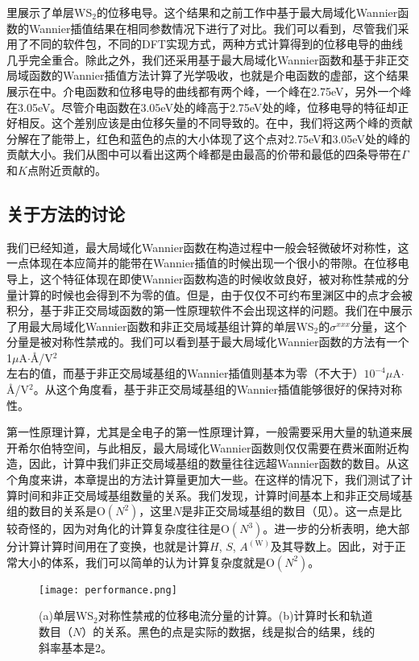 里展示了单层WS$_2$的位移电导。这个结果和之前工作中基于最大局域化Wannier函数的Wannier插值结果在相同参数情况下进行了对比。我们可以看到，尽管我们采用了不同的软件包，不同的DFT实现方式，两种方式计算得到的位移电导的曲线几乎完全重合。除此之外，我们还采用基于最大局域化Wannier函数和基于非正交局域函数的Wannier插值方法计算了光学吸收，也就是介电函数的虚部，这个结果展示在中。介电函数和位移电导的曲线都有两个峰，一个峰在2.75eV，另外一个峰在3.05eV。尽管介电函数在3.05eV处的峰高于2.75eV处的峰，位移电导的特征却正好相反。这个差别应该是由位移矢量的不同导致的。在中，我们将这两个峰的贡献分解在了能带上，红色和蓝色的点的大小体现了这个点对2.75eV和3.05eV处的峰的贡献大小。我们从图中可以看出这两个峰都是由最高的价带和最低的四条导带在$\Gamma$和$K$点附近贡献的。


\subsection{关于方法的讨论}

我们已经知道，最大局域化Wannier函数在构造过程中一般会轻微破坏对称性，这一点体现在本应简并的能带在Wannier插值的时候出现一个很小的带隙。在位移电导上，这个特征体现在即使Wannier函数构造的时候收敛良好，被对称性禁戒的分量计算的时候也会得到不为零的值。但是，由于仅仅不可约布里渊区中的点才会被积分，基于非正交局域函数的第一性原理软件不会出现这样的问题。我们在中展示了用最大局域化Wannier函数和非正交局域基组计算的单层WS$_2$的$\sigma^{xxx}$分量，这个分量是被对称性禁戒的。我们可以看到基于最大局域化Wannier函数的方法有一个1$\mu$A$\cdot$\AA/V$^2$左右的值，而基于非正交局域基组的Wannier插值则基本为零（不大于）$10^{-4}\mu$A$\cdot$\AA/V$^2$。从这个角度看，基于非正交局域基组的Wannier插值能够很好的保持对称性。

第一性原理计算，尤其是全电子的第一性原理计算，一般需要采用大量的轨道来展开希尔伯特空间，与此相反，最大局域化Wannier函数则仅仅需要在费米面附近构造，因此，计算中我们非正交局域基组的数量往往远超Wannier函数的数目。从这个角度来讲，本章提出的方法计算量更加大一些。在这样的情况下，我们测试了计算时间和非正交局域基组数量的关系。我们发现，计算时间基本上和非正交局域基组的数目的关系是$\text{O}(N^2)$，这里$N$是非正交局域基组的数目（见）。这一点是比较奇怪的，因为对角化的计算复杂度往往是$\text{O}(N^3)$。进一步的分析表明，绝大部分计算计算时间用在了变换，也就是计算$H$, $S$, $A^{(\text{W})}$及其导数上。因此，对于正常大小的体系，我们可以简单的认为计算复杂度就是$\text{O}(N^2)$。

\begin{figure}
    \texttt{[image: performance.png]}
    \centering
    \caption{(a)单层WS$_2$对称性禁戒的位移电流分量的计算。(b)计算时长和轨道数目（$N$）的关系。黑色的点是实际的数据，线是拟合的结果，线的斜率基本是2。\label{fig:performance}}
\end{figure}

